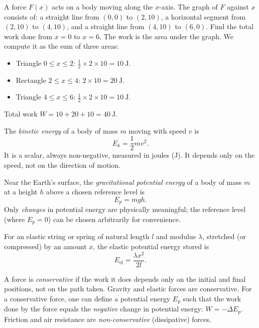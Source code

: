 \documentclass[11pt]{article}
\newcounter{popsec}
\newcounter{popsub}
\newcommand{\courssub}[1]{%
  \stepcounter{popsub}%
  \par\vspace{9pt}\noindent{\popxbold\fontsize{11.5}{13}\selectfont\color{popink}{\color{poporange}\thepopsec.\thepopsub}\hspace{6pt}#1}\par\nopagebreak\vspace{4pt}
}
\begin{document}
\begin{exoresolu}
A force $F(x)$ acts on a body moving along the $x$-axis. The graph of $F$ against $x$ consists of: a straight line from $(0,0)$ to $(2,10)$, a horizontal segment from $(2,10)$ to $(4,10)$, and a straight line from $(4,10)$ to $(6,0)$. Find the total work done from $x=0$ to $x=6$.
\tcblower
The work is the area under the graph. We compute it as the sum of three areas:
\begin{itemize}
\item Triangle $0 \le x \le 2$: $\frac{1}{2} \times 2 \times 10 = 10\ \mathrm{J}$.
\item Rectangle $2 \le x \le 4$: $2 \times 10 = 20\ \mathrm{J}$.
\item Triangle $4 \le x \le 6$: $\frac{1}{2} \times 2 \times 10 = 10\ \mathrm{J}$.
\end{itemize}
Total work $W = 10 + 20 + 10 = 40\ \mathrm{J}$.
\end{exoresolu}

\courssub{Energy: Kinetic and Potential}

\begin{definition}
The \emph{kinetic energy} of a body of mass $m$ moving with speed $v$ is
\[
E_k = \frac{1}{2}mv^2.
\]
It is a scalar, always non-negative, measured in joules (J). It depends only on the speed, not on the direction of motion.
\end{definition}

\begin{definition}
Near the Earth's surface, the \emph{gravitational potential energy} of a body of mass $m$ at a height $h$ above a chosen reference level is
\[
E_p = mgh.
\]
Only \emph{changes} in potential energy are physically meaningful; the reference level (where $E_p = 0$) can be chosen arbitrarily for convenience.
\end{definition}

\begin{definition}
For an elastic string or spring of natural length $l$ and modulus $\lambda$, stretched (or compressed) by an amount $x$, the elastic potential energy stored is
\[
E_{\text{el}} = \frac{\lambda x^2}{2l}.
\]
\end{definition}

\begin{propriete}
A force is \emph{conservative} if the work it does depends only on the initial and final positions, not on the path taken. Gravity and elastic forces are conservative. For a conservative force, one can define a potential energy $E_p$ such that the work done by the force equals the \emph{negative} change in potential energy: $W = -\Delta E_p$. Friction and air resistance are \emph{non-conservative} (dissipative) forces.
\end{propriete}
\end{document}
